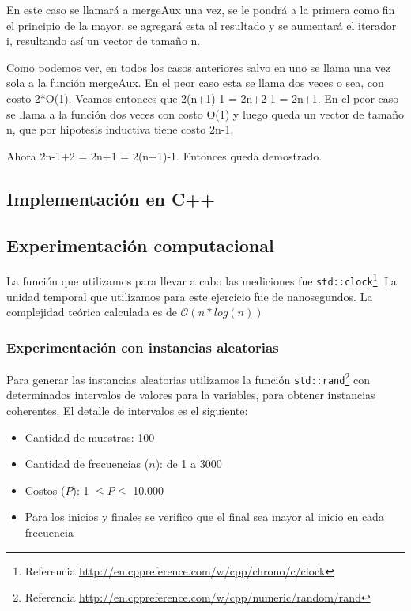 \begin{itemize}
\begin{itemize}
En este caso se llamará a mergeAux una vez, se le pondrá a la primera como fin el principio de la mayor, se agregará esta al resultado y se aumentará el iterador i, resultando así un vector de tamaño n.

\end{itemize}

Como podemos ver, en todos los casos anteriores salvo en uno se llama una vez sola a la función mergeAux. En el peor caso esta se llama dos veces o sea, con costo 2*O(1). Veamos entonces que 2(n+1)-1 = 2n+2-1 = 2n+1. En el peor caso se llama a la función dos veces con costo O(1) y luego queda un vector de tamaño n, que por hipotesis inductiva tiene costo 2n-1.

Ahora 2n-1+2 = 2n+1 = 2(n+1)-1. Entonces queda demostrado.

 
\end{itemize} 
 
 

\newpage
\subsection{Implementación en C++}





\subsection{Experimentación computacional}
La función que utilizamos para llevar a cabo las mediciones fue \texttt{std::clock}\footnote{Referencia \url{http://en.cppreference.com/w/cpp/chrono/c/clock}}. La unidad temporal que utilizamos para este ejercicio fue de nanosegundos.
La complejidad teórica calculada es de $\mathcal{O}(n*log(n))$

\subsubsection{Experimentación con instancias aleatorias}
Para generar las instancias aleatorias utilizamos la función \texttt{std::rand}\footnote{Referencia \url{http://en.cppreference.com/w/cpp/numeric/random/rand}} con determinados intervalos de valores para la variables, para obtener instancias coherentes. El detalle de intervalos es el siguiente:
\begin{itemize}
	\item Cantidad de muestras: 100
	\item Cantidad de frecuencias ($n$): de 1 a 3000
    \item Costos ($P$): 1 $\leq P \leq$ 10.000
    \item Para los inicios y finales se verifico que el final sea mayor al inicio en cada frecuencia
\end{itemize}

